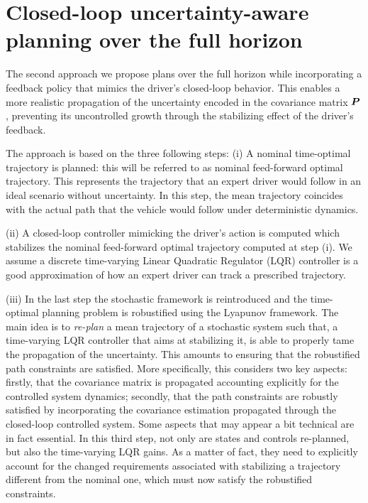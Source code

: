 \section{Closed-loop uncertainty-aware planning over the full horizon}
\label{sec:closed_loop_planning}

The second approach we propose plans over the full horizon while incorporating a feedback policy that mimics the driver's closed-loop behavior. This enables a more realistic propagation of the uncertainty encoded in the covariance matrix $\boldsymbol{P}$, preventing its uncontrolled growth through the stabilizing effect of the driver's feedback.

The approach is based on the three following steps: (i) A nominal time-optimal trajectory is planned: this will be referred to as nominal feed-forward optimal trajectory. This represents the trajectory that an expert driver would follow in an ideal scenario without uncertainty. In this step, the mean trajectory coincides with the actual path that the vehicle would follow under deterministic dynamics.

(ii) A closed-loop controller mimicking the driver's action is computed which stabilizes the nominal feed-forward optimal trajectory computed at step (i). We assume a discrete time-varying Linear Quadratic Regulator (LQR) controller is a good approximation of how an expert driver can track a prescribed trajectory.

(iii) In the last step the stochastic framework is reintroduced and the time-optimal planning problem is robustified using the Lyapunov framework. The main idea is to \emph{re-plan} a mean trajectory of a stochastic system such that, a time-varying LQR controller that aims at stabilizing it, is able to properly tame the propagation of the uncertainty. This amounts to ensuring that the robustified path constraints are satisfied. More specifically, this considers two key aspects: firstly, that the covariance matrix is propagated accounting explicitly for the controlled system dynamics; secondly, that the path constraints are robustly satisfied by incorporating the covariance estimation propagated through the closed-loop controlled system. Some aspects that may appear a bit technical are in fact essential. In this third step, not only are states and controls re-planned, but also the time-varying LQR gains. As a matter of fact, they need to explicitly account for the changed requirements associated with stabilizing a trajectory different from the nominal one, which must now satisfy the robustified constraints. 
